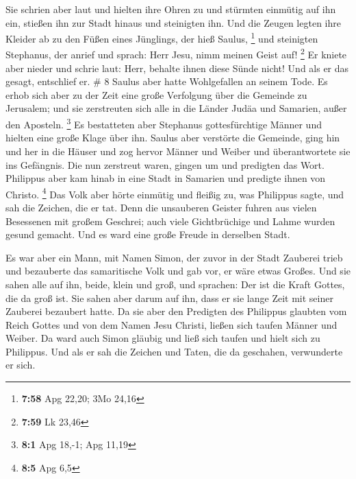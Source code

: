  Sie schrien aber laut und hielten ihre Ohren zu und
stürmten einmütig auf ihn ein, stießen ihn zur Stadt hinaus und
steinigten ihn.  Und die Zeugen legten ihre Kleider ab zu
den Füßen eines Jünglings, der hieß Saulus, \footnote{\textbf{7:58} Apg
  22,20; 3Mo 24,16}  und steinigten Stephanus, der anrief
und sprach: Herr Jesu, nimm meinen Geist auf! \footnote{\textbf{7:59} Lk
  23,46}  Er kniete aber nieder und schrie laut: Herr,
behalte ihnen diese Sünde nicht! Und als er das gesagt, entschlief er.
\# 8  Saulus aber hatte Wohlgefallen an seinem Tode. Es
erhob sich aber zu der Zeit eine große Verfolgung über die Gemeinde zu
Jerusalem; und sie zerstreuten sich alle in die Länder Judäa und
Samarien, außer den Aposteln. \footnote{\textbf{8:1} Apg 18,-1; Apg
  11,19}  Es bestatteten aber Stephanus gottesfürchtige
Männer und hielten eine große Klage über ihn.  Saulus aber
verstörte die Gemeinde, ging hin und her in die Häuser und zog hervor
Männer und Weiber und überantwortete sie ins Gefängnis. 
Die nun zerstreut waren, gingen um und predigten das Wort.
 Philippus aber kam hinab in eine Stadt in Samarien und
predigte ihnen von Christo. \footnote{\textbf{8:5} Apg 6,5}
 Das Volk aber hörte einmütig und fleißig zu, was
Philippus sagte, und sah die Zeichen, die er tat.  Denn
die unsauberen Geister fuhren aus vielen Besessenen mit großem Geschrei;
auch viele Gichtbrüchige und Lahme wurden gesund gemacht. 
Und es ward eine große Freude in derselben Stadt.

 Es war aber ein Mann, mit Namen Simon, der zuvor in der
Stadt Zauberei trieb und bezauberte das samaritische Volk und gab vor,
er wäre etwas Großes.  Und sie sahen alle auf ihn, beide,
klein und groß, und sprachen: Der ist die Kraft Gottes, die da groß ist.
 Sie sahen aber darum auf ihn, dass er sie lange Zeit mit
seiner Zauberei bezaubert hatte.  Da sie aber den
Predigten des Philippus glaubten vom Reich Gottes und von dem Namen Jesu
Christi, ließen sich taufen Männer und Weiber.  Da ward
auch Simon gläubig und ließ sich taufen und hielt sich zu Philippus. Und
als er sah die Zeichen und Taten, die da geschahen, verwunderte er sich.


